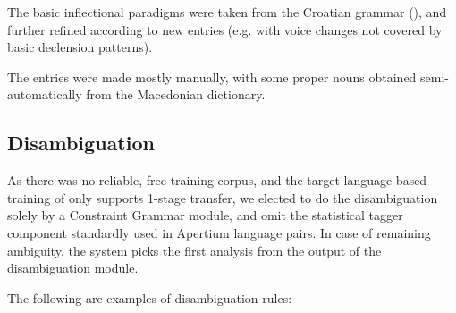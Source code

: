 \documentclass{book}
\begin{document}
The basic inflectional paradigms were taken from the Croatian grammar (\citealp{baric1997hrvatska}), 
and further refined according to new entries (e.g. with voice changes not covered by basic declension
patterns).

The entries were made mostly manually, with some proper nouns obtained semi-automatically from the Macedonian
dictionary.

\subsection*{Disambiguation}
As there was no reliable, free training corpus, and the target-language 
based training of \cite{sanchez2008using} only supports 1-stage transfer, we elected 
to do the disambiguation solely by a Constraint Grammar module, and omit the
statistical tagger component standardly used in Apertium language pairs. In case of remaining 
ambiguity, the system picks the first analysis from the output of the disambiguation 
module.



\pagebreak
The following are examples of disambiguation rules:
\end{document}
